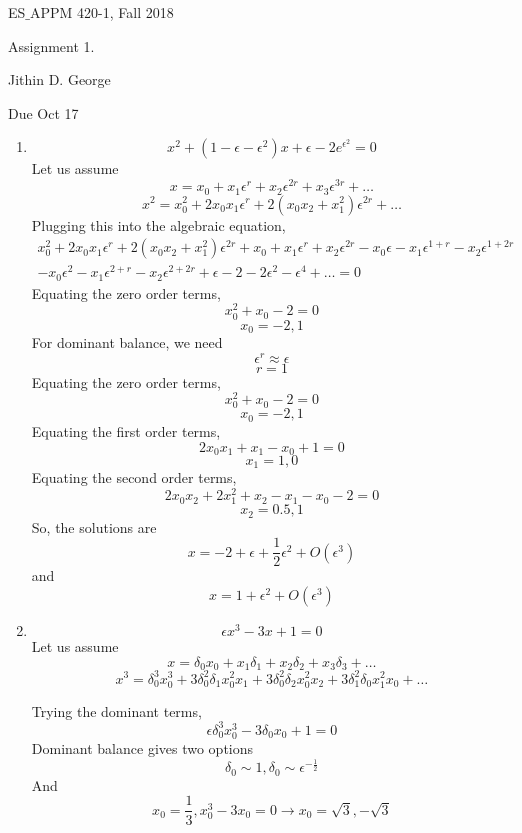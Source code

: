\documentclass[letterpaper,12pt]{article}
\begin{document}




\noindent
{\scriptsize ES$\_$APPM 420-1, Fall 2018} \hfill

\begin{center}
\large
Assignment 1.
\normalsize

Jithin D. George
\end{center}

\noindent
Due Oct 17

\vspace{.3in}




\noindent


\begin{enumerate}
\item
\[x^2 +(1-\epsilon - \epsilon^2)x+\epsilon-2e^{\epsilon^2}=0\]
Let us assume
\[x = x_0 + x_1\epsilon^{r}+ x_2\epsilon^{2r} + x_3\epsilon^{3r} +\hdots\]
\[x^2 = x_0^2 + 2 x_0 x_1\epsilon^{r}+ 2(x_0x_2+x_1^2)\epsilon^{2r}  +\hdots\]
Plugging this into the algebraic equation,
\begin{align*}
x_0^2 + 2 x_0 x_1\epsilon^{r}+ 2(x_0x_2+x_1^2)\epsilon^{2r}  +x_0 + x_1\epsilon^{r}+ x_2\epsilon^{2r} - x_0 \epsilon - x_1\epsilon^{1+r}- x_2\epsilon^{1+2r} \\
- x_0 \epsilon^2 - x_1\epsilon^{2+r}- x_2\epsilon^{2+2r} + \epsilon - 2 -2\epsilon^2-\epsilon^4 +\hdots =0
\end{align*}
Equating the zero order terms,
\[x_0^2+x_0-2=0\]
\[x_0 = -2,1\]
For dominant balance, we need
\[\epsilon^r \approx \epsilon\]
\[r=1\]
Equating the zero order terms,
\[x_0^2+x_0-2=0\]
\[x_0 = -2,1\]
Equating the first order terms,
\[2x_0x_1+x_1-x_0+1=0\]
\[x_1 = 1,0\]
Equating the second  order terms,
\[2x_0x_2+2x_1^2+x_2-x_1-x_0-2=0\]
\[x_2 = 0.5,1\]
So, the solutions are
\[x = -2 + \epsilon+ \frac{1}{2}\epsilon^{2}  +O(\epsilon^3)\]
and
\[x = 1 +  \epsilon^{2}  +O(\epsilon^3)\]

\item
\[\epsilon x^3 - 3x+1=0\]
Let us assume
\[x = \delta_0 x_0 + x_1 \delta_1+ x_2 \delta_2 + x_3 \delta_3 +\hdots\]
\[x^3 = \delta_0^3 x_0^3 + 3 \delta_0^2 \delta_1 x_0^2 x_1   + 3 \delta_0^2 \delta_2 x_0^2 x_2 +3 \delta_1^2 \delta_0 x_1^2 x_0   +   \hdots\]

Trying the dominant terms,
\[\epsilon \delta_0^3 x_0^3- 3 \delta_0 x_0 +1 =0 \]
Dominant balance gives two options
\[ \delta_0 \sim 1, \delta_0 \sim \epsilon^{-\frac{1}{2}}\]
And
\[x_0 = \frac{1}{3},x_0^3-3x_0=0 \to x_0 = \sqrt{3}, -\sqrt{3}\]


\end{enumerate}
\end{document}
